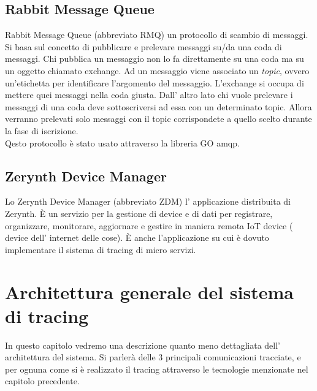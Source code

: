 \documentclass[a4paper,12pt,titlepage,italian,openany]{report}
\begin{document}
\section{Rabbit Message Queue}
Rabbit Message Queue\cite{rabbit:1} (abbreviato RMQ) un protocollo di scambio di messaggi. Si basa sul concetto di pubblicare e prelevare messaggi su/da una coda di messaggi. Chi pubblica un messaggio non lo fa direttamente su una coda ma su un oggetto chiamato exchange. Ad un messaggio viene associato un \textit{topic}, ovvero un'etichetta per identificare l'argomento del messaggio. L'exchange si occupa di mettere quei messaggi nella coda giusta. Dall' altro lato chi 
vuole prelevare i messaggi di una coda deve sottoscriversi ad essa con un determinato topic. Allora verranno prelevati solo messaggi con il topic corrispondete a quello scelto durante la fase di iscrizione.\\
Qesto protocollo è stato usato attraverso la libreria GO amqp.
\section{Zerynth Device Manager}
Lo Zerynth Device Manager\cite{zdm:1} (abbreviato ZDM) l' applicazione distribuita di Zerynth. È un servizio per la gestione di device e di dati per registrare, organizzare, monitorare, aggiornare e gestire in maniera remota IoT device ( device dell' internet delle cose).
È anche l'applicazione su cui è dovuto implementare il sistema di tracing di micro servizi.

\chapter{Architettura generale del sistema di tracing}
In questo capitolo vedremo una descrizione quanto meno dettagliata dell' architettura del sistema. Si parlerà delle 3 principali comunicazioni tracciate, e per ognuna come si è realizzato il tracing attraverso le
tecnologie menzionate nel capitolo precedente.
\end{document}

